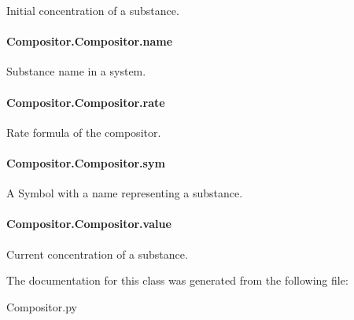 Initial concentration of a substance. 

\paragraph[{\texorpdfstring{name}{name}}]{\setlength{\rightskip}{0pt plus 5cm}Compositor.\+Compositor.\+name}\hypertarget{classCompositor_1_1Compositor_a87d9f58151be1502f8a10ffb4cdb8515}{}\label{classCompositor_1_1Compositor_a87d9f58151be1502f8a10ffb4cdb8515}


Substance name in a system. 

\paragraph[{\texorpdfstring{rate}{rate}}]{\setlength{\rightskip}{0pt plus 5cm}Compositor.\+Compositor.\+rate}\hypertarget{classCompositor_1_1Compositor_acfb506bc53105422233aad45a7eaa6fe}{}\label{classCompositor_1_1Compositor_acfb506bc53105422233aad45a7eaa6fe}


Rate formula of the compositor. 

\paragraph[{\texorpdfstring{sym}{sym}}]{\setlength{\rightskip}{0pt plus 5cm}Compositor.\+Compositor.\+sym}\hypertarget{classCompositor_1_1Compositor_aa46010406a3b768a7b6a864166e71947}{}\label{classCompositor_1_1Compositor_aa46010406a3b768a7b6a864166e71947}


A Symbol with a {\ttfamily name} representing a substance. 

\paragraph[{\texorpdfstring{value}{value}}]{\setlength{\rightskip}{0pt plus 5cm}Compositor.\+Compositor.\+value}\hypertarget{classCompositor_1_1Compositor_a897d2fe21edf2aa868e7a47c8db7a007}{}\label{classCompositor_1_1Compositor_a897d2fe21edf2aa868e7a47c8db7a007}


Current concentration of a substance. 



The documentation for this class was generated from the following file\+:\begin{DoxyCompactItemize}
\item 
Compositor.\+py\end{DoxyCompactItemize}
